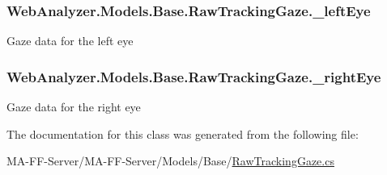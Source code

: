 \subsubsection[{\+\_\+left\+Eye}]{ Web\+Analyzer.\+Models.\+Base.\+Raw\+Tracking\+Gaze.\+\_\+left\+Eye\hspace{0.3cm}{\ttfamily [private]}}\label{class_web_analyzer_1_1_models_1_1_base_1_1_raw_tracking_gaze_a50d308230da6fdb235fa19273a8264da}


Gaze data for the left eye 

\hypertarget{class_web_analyzer_1_1_models_1_1_base_1_1_raw_tracking_gaze_abd10432d6263254b7ebefe31ade87131}{}
\subsubsection[{\+\_\+right\+Eye}]{ Web\+Analyzer.\+Models.\+Base.\+Raw\+Tracking\+Gaze.\+\_\+right\+Eye\hspace{0.3cm}{\ttfamily [private]}}\label{class_web_analyzer_1_1_models_1_1_base_1_1_raw_tracking_gaze_abd10432d6263254b7ebefe31ade87131}


Gaze data for the right eye 



The documentation for this class was generated from the following file\+:\begin{DoxyCompactItemize}
\item 
M\+A-\/\+F\+F-\/\+Server/\+M\+A-\/\+F\+F-\/\+Server/\+Models/\+Base/\hyperlink{_raw_tracking_gaze_8cs}{Raw\+Tracking\+Gaze.\+cs}\end{DoxyCompactItemize}
